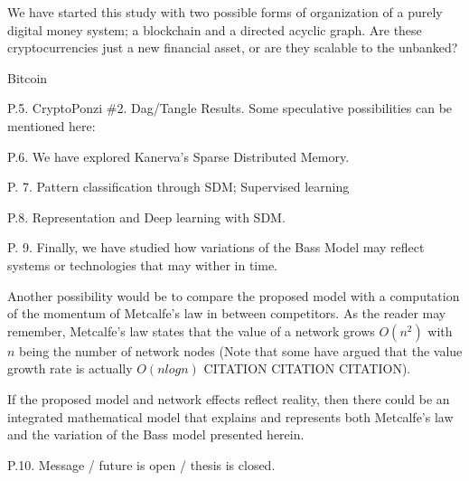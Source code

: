 We have started this study with two possible forms of organization of a purely digital money system; a blockchain and a directed acyclic graph.  Are these cryptocurrencies just a new financial asset, or are they scalable to the unbanked?

Bitcoin

P.5. CryptoPonzi \#2. Dag/Tangle Results. Some speculative possibilities can be mentioned here:  



P.6. We have explored Kanerva’s Sparse Distributed Memory.   


P. 7. Pattern classification through SDM; Supervised learning 


P.8. Representation and Deep learning with SDM.  


P. 9. Finally, we have studied how variations of the Bass Model may reflect systems or technologies that may wither in time. 

Another possibility would be to compare the proposed model with a computation of the momentum of Metcalfe’s law in between competitors.  As the reader may remember, Metcalfe’s law states that the value of a network grows $O(n^2)$ with $n$ being the number of network nodes (Note that some have argued that the value growth rate is actually $O(n log n)$ CITATION CITATION CITATION). 

If the proposed model and network effects reflect reality, then there could be an integrated mathematical model that explains and represents both Metcalfe’s law and the variation of the Bass model presented herein.  

P.10.  Message / future is open / thesis is closed.  